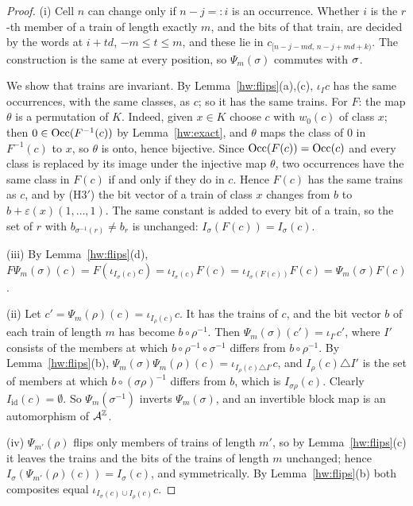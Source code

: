 \begin{proof}
(i) Cell $n$ can change only if $n-j=:i$ is an occurrence. Whether $i$ is the $r$-th member of a train of length exactly $m$, and the bits of that train, are decided by the words at $i+td$, $-m\le t\le m$, and these lie in $c_{[n-j-md,\,n-j+md+k)}$. The construction is the same at every position, so $\Psi_m(\sigma)$ commutes with $\sigma$.

We show that trains are invariant. By Lemma~\ref{hw:flips}(a),(c), $\iota_Ic$ has the same occurrences, with the same classes, as $c$; so it has the same trains. For $F$: the map $\theta$ is a permutation of $K$. Indeed, given $x\in K$ choose $c$ with $w_0(c)$ of class $x$; then $0\in\operatorname{Occ}(F^{-1}(c))$ by Lemma~\ref{hw:exact}, and $\theta$ maps the class of $0$ in $F^{-1}(c)$ to $x$, so $\theta$ is onto, hence bijective. Since $\operatorname{Occ}(F(c))=\operatorname{Occ}(c)$ and every class is replaced by its image under the injective map $\theta$, two occurrences have the same class in $F(c)$ if and only if they do in $c$. Hence $F(c)$ has the same trains as $c$, and by (H3$'$) the bit vector of a train of class $x$ changes from $b$ to $b+\varepsilon(x)(1,\dots,1)$. The same constant is added to every bit of a train, so the set of $r$ with $b_{\sigma^{-1}(r)}\ne b_r$ is unchanged: $I_\sigma(F(c))=I_\sigma(c)$.

(iii) By Lemma~\ref{hw:flips}(d), $F\Psi_m(\sigma)(c)=F(\iota_{I_\sigma(c)}c)=\iota_{I_\sigma(c)}F(c)=\iota_{I_\sigma(F(c))}F(c)=\Psi_m(\sigma)F(c)$.

(ii) Let $c'=\Psi_m(\rho)(c)=\iota_{I_\rho(c)}c$. It has the trains of $c$, and the bit vector $b$ of each train of length $m$ has become $b\circ\rho^{-1}$. Then $\Psi_m(\sigma)(c')=\iota_{I'}c'$, where $I'$ consists of the members at which $b\circ\rho^{-1}\circ\sigma^{-1}$ differs from $b\circ\rho^{-1}$. By Lemma~\ref{hw:flips}(b), $\Psi_m(\sigma)\Psi_m(\rho)(c)=\iota_{I_\rho(c)\triangle I'}c$, and $I_\rho(c)\triangle I'$ is the set of members at which $b\circ(\sigma\rho)^{-1}$ differs from $b$, which is $I_{\sigma\rho}(c)$. Clearly $I_{\mathrm{id}}(c)=\emptyset$. So $\Psi_m(\sigma^{-1})$ inverts $\Psi_m(\sigma)$, and an invertible block map is an automorphism of $\mathcal{A}^{\mathbb{Z}}$.

(iv) $\Psi_{m'}(\rho)$ flips only members of trains of length $m'$, so by Lemma~\ref{hw:flips}(c) it leaves the trains and the bits of the trains of length $m$ unchanged; hence $I_\sigma(\Psi_{m'}(\rho)(c))=I_\sigma(c)$, and symmetrically. By Lemma~\ref{hw:flips}(b) both composites equal $\iota_{I_\sigma(c)\cup I_\rho(c)}c$.
\end{proof}

